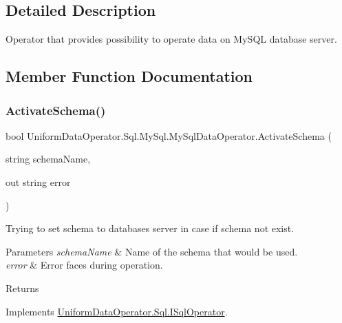 \subsection{Detailed Description}
Operator that provides possibility to operate data on My\+S\+QL database server. 



\subsection{Member Function Documentation}
\mbox{\label{class_uniform_data_operator_1_1_sql_1_1_my_sql_1_1_my_sql_data_operator_a2ed7d06bc016ae6d07cbcceffc21bbd3}} 
\subsubsection{\texorpdfstring{Activate\+Schema()}{ActivateSchema()}}
{\footnotesize\ttfamily bool Uniform\+Data\+Operator.\+Sql.\+My\+Sql.\+My\+Sql\+Data\+Operator.\+Activate\+Schema (\begin{DoxyParamCaption}\item[{string}]{schema\+Name,  }\item[{out string}]{error }\end{DoxyParamCaption})}



Trying to set schema to databases server in case if schema not exist. 


\begin{DoxyParams}{Parameters}
{\em schema\+Name} & Name of the schema that would be used.\\
\hline
{\em error} & Error faces during operation.\\
\hline
\end{DoxyParams}
\begin{DoxyReturn}{Returns}

\end{DoxyReturn}


Implements \mbox{\hyperlink{interface_uniform_data_operator_1_1_sql_1_1_i_sql_operator_a5ae8328a464ef80f1ae1bd46a573c265}{Uniform\+Data\+Operator.\+Sql.\+I\+Sql\+Operator}}.

